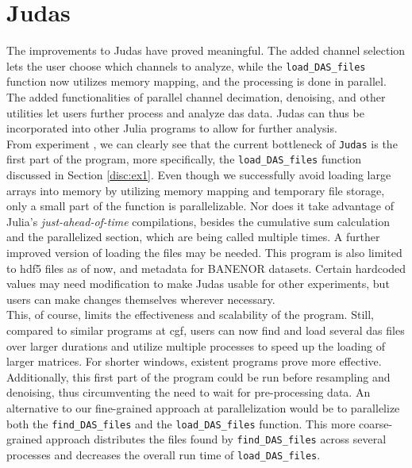 \section{Judas}
\label{disc:judas}

The improvements to Judas have proved meaningful. The added channel selection lets the user choose which channels to analyze, while the \texttt{load\_DAS\_files} function now utilizes memory mapping, and the processing is done in parallel. The added functionalities of parallel channel decimation, denoising, and other utilities let users further process and analyze \acrshort{das} data. Judas can thus be incorporated into other Julia programs to allow for further analysis. \\

From experiment , we can clearly see that the current bottleneck of \texttt{Judas} is the first part of the program, more specifically, the \texttt{load\_DAS\_files} function discussed in Section \ref{disc:ex1}. Even though we successfully avoid loading large arrays into memory by utilizing memory mapping and temporary file storage, only a small part of the function is parallelizable. Nor does it take advantage of Julia's \textit{just-ahead-of-time} compilations, besides the cumulative sum calculation and the parallelized section, which are being called multiple times. A further improved version of loading the files may be needed. This program is also limited to \acrshort{hdf5} files as of now, and metadata for BANENOR datasets. Certain hardcoded values may need modification to make Judas usable for other experiments, but users can make changes themselves wherever necessary. \\

This, of course, limits the effectiveness and scalability of the program. Still, compared to similar programs at \acrshort{cgf}, users can now find and load several \acrshort{das} files over larger durations and utilize multiple processes to speed up the loading of larger matrices. For shorter windows, existent programs prove more effective. \\

Additionally, this first part of the program could be run before resampling and denoising, thus circumventing the need to wait for pre-processing data. An alternative to our fine-grained approach at parallelization would be to parallelize both the \texttt{find\_DAS\_files} and the \texttt{load\_DAS\_files} function. This more coarse-grained approach distributes the files found by \texttt{find\_DAS\_files} across several processes and decreases the overall run time of \texttt{load\_DAS\_files}.\\

